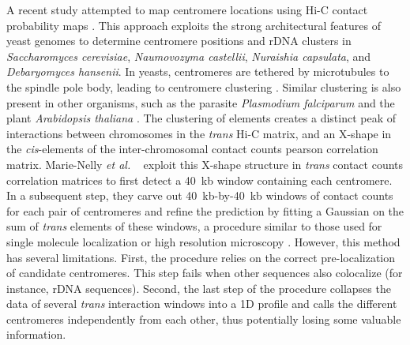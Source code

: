 A recent study attempted to map centromere locations using Hi-C contact
probability maps \citep{marie-nelly:filling}. This approach exploits the
strong architectural features of yeast genomes to determine centromere
positions and rDNA clusters in \textit{Saccharomyces cerevisiae},
\textit{Naumovozyma castellii}, \textit{Nuraishia capsulata}, and
\textit{Debaryomyces hansenii}. 
In yeasts, centromeres are tethered by microtubules to the spindle
pole body, leading to centromere clustering \citep{mizuguchi:cohesin}.
Similar clustering is also present in other organisms, such as the
parasite \textit{Plasmodium falciparum} and the plant
\textit{Arabidopsis thaliana} \cite{ay:three-dimensional,
  feng:genome-wide}.
The clustering of elements creates a
distinct peak of interactions between chromosomes in the \textit{trans} Hi-C
matrix, and an X-shape in the \textit{cis}-elements of the inter-chromosomal
contact counts pearson correlation matrix.
Marie-Nelly \textit{et al. }~\cite{marie-nelly:filling} exploit this
X-shape structure in \textit{trans} contact counts correlation
matrices to first detect a 40~kb window containing each centromere.
In a subsequent step,
they carve out 40~kb-by-40~kb windows of contact counts
for each pair of centromeres and refine
the prediction by fitting a Gaussian on the sum of \textit{trans} elements of
these windows, a procedure similar to those used for single molecule
localization or high resolution microscopy \citep{Ober:localization}. However,
this method has several limitations. First, the procedure relies on the
correct pre-localization of candidate centromeres. This step fails when other
sequences also colocalize (for instance, rDNA sequences). Second, the last
step of the procedure collapses the data of several \textit{trans} interaction
windows into a 1D profile and calls the different centromeres independently
from each other, thus potentially losing some valuable information.

